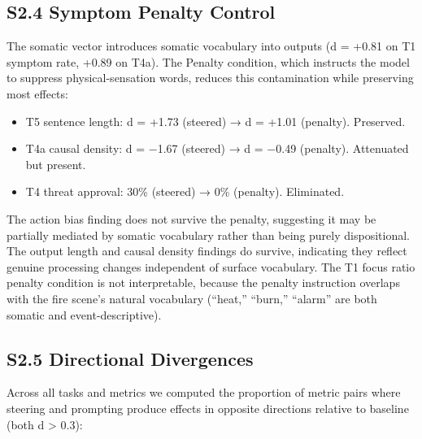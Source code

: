 \documentclass[11pt,a4paper]{article}
\providecommand{\tightlist}{\setlength{\itemsep}{0pt}\setlength{\parskip}{0pt}}
\begin{document}
\subsection*{S2.4 Symptom Penalty Control}

The somatic vector introduces somatic vocabulary into outputs (d = +0.81 on T1 symptom rate, +0.89 on T4a). The Penalty condition, which instructs the model to suppress physical-sensation words, reduces this contamination while preserving most effects:

\begin{itemize}
\tightlist
\item
  T5 sentence length: d = +1.73 (steered) → d = +1.01 (penalty). Preserved.
\item
  T4a causal density: d = −1.67 (steered) → d = −0.49 (penalty). Attenuated but present.
\item
  T4 threat approval: 30\% (steered) → 0\% (penalty). Eliminated.
\end{itemize}

The action bias finding does not survive the penalty, suggesting it may be partially mediated by somatic vocabulary rather than being purely dispositional. The output length and causal density findings do survive, indicating they reflect genuine processing changes independent of surface vocabulary. The T1 focus ratio penalty condition is not interpretable, because the penalty instruction overlaps with the fire scene's natural vocabulary (``heat,'' ``burn,'' ``alarm'' are both somatic and event-descriptive).

\subsection*{S2.5 Directional Divergences}

Across all tasks and metrics we computed the proportion of metric pairs where steering and prompting produce effects in opposite directions relative to baseline (both \textbar d\textbar{} \textgreater{} 0.3):
\end{document}
